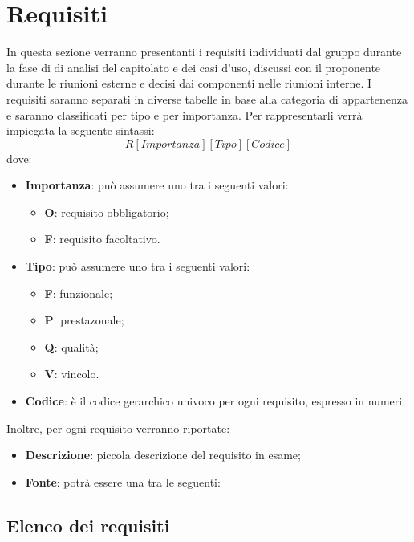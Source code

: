 \documentclass[../AnalisiDeiRequisiti.tex]{subfiles}
\begin{document}
\section{Requisiti}
	In questa sezione verranno presentanti i requisiti individuati dal gruppo durante la fase di di analisi del capitolato e dei casi d'uso, discussi con il proponente durante le riunioni esterne e decisi dai componenti nelle riunioni interne. I requisiti saranno separati in diverse tabelle in base alla categoria di appartenenza e saranno classificati per tipo e per importanza. Per rappresentarli verrà impiegata la seguente sintassi:
	\begin{equation*}
		R[Importanza][Tipo][Codice]
	\end{equation*}
	dove:
	\begin{itemize}
		\item \textbf{Importanza}: può assumere uno tra i seguenti valori:
		\begin{itemize}
			\item \textbf{O}: requisito obbligatorio;
			\item \textbf{F}: requisito facoltativo.
		\end{itemize}
		\item \textbf{Tipo}: può assumere uno tra i seguenti valori:
		\begin{itemize}
			\item \textbf{F}: funzionale;
			\item \textbf{P}: prestazonale;
			\item \textbf{Q}: qualità;
			\item \textbf{V}: vincolo.
		\end{itemize}	
		\item \textbf{Codice}: è il codice gerarchico univoco per ogni requisito, espresso in numeri.
	\end{itemize}
	Inoltre, per ogni requisito verranno riportate:
	\begin{itemize}
		\item \textbf{Descrizione}: piccola descrizione del requisito in esame;
		\item \textbf{Fonte}: potrà essere una tra le seguenti:
	\end{itemize}
	
	\newpage
	\subsection{Elenco dei requisiti}
\end{document}
